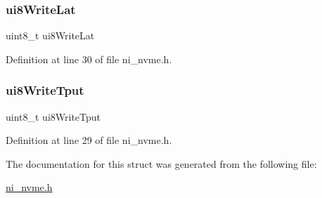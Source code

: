 \subsubsection{\texorpdfstring{ui8WriteLat}{ui8WriteLat}}
{\footnotesize\ttfamily uint8\+\_\+t ui8\+Write\+Lat}



Definition at line 30 of file ni\+\_\+nvme.\+h.

\mbox{\label{struct__ni__nvme__id__power__state_a00f0f3da4cd85591d84f7027c5d22858}} 
\subsubsection{\texorpdfstring{ui8WriteTput}{ui8WriteTput}}
{\footnotesize\ttfamily uint8\+\_\+t ui8\+Write\+Tput}



Definition at line 29 of file ni\+\_\+nvme.\+h.



The documentation for this struct was generated from the following file\+:\begin{DoxyCompactItemize}
\item 
\mbox{\hyperlink{ni__nvme_8h}{ni\+\_\+nvme.\+h}}\end{DoxyCompactItemize}
